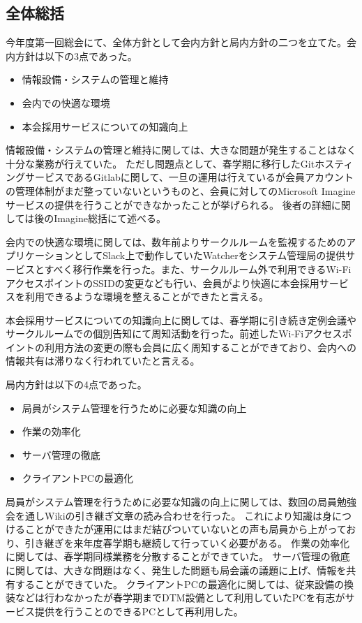 \subsection*{全体総括}


今年度第一回総会にて、全体方針として会内方針と局内方針の二つを立てた。会内方針は以下の3点であった。
\begin{itemize}
  \item 情報設備・システムの管理と維持
  \item 会内での快適な環境
  \item 本会採用サービスについての知識向上
\end{itemize}

情報設備・システムの管理と維持に関しては、大きな問題が発生することはなく十分な業務が行えていた。
ただし問題点として、春学期に移行したGitホスティングサービスであるGitlabに関して、一旦の運用は行えているが会員アカウントの管理体制がまだ整っていないというものと、会員に対してのMicrosoft Imagineサービスの提供を行うことができなかったことが挙げられる。
後者の詳細に関しては後のImagine総括にて述べる。

会内での快適な環境に関しては、数年前よりサークルルームを監視するためのアプリケーションとしてSlack上で動作していたWatcherをシステム管理局の提供サービスとすべく移行作業を行った。また、サークルルーム外で利用できるWi-FiアクセスポイントのSSIDの変更なども行い、会員がより快適に本会採用サービスを利用できるような環境を整えることができたと言える。

本会採用サービスについての知識向上に関しては、春学期に引き続き定例会議やサークルルームでの個別告知にて周知活動を行った。前述したWi-Fiアクセスポイントの利用方法の変更の際も会員に広く周知することができており、会内への情報共有は滞りなく行われていたと言える。

局内方針は以下の4点であった。
\begin{itemize}
  \item 局員がシステム管理を行うために必要な知識の向上
  \item 作業の効率化
  \item サーバ管理の徹底
  \item クライアントPCの最適化
\end{itemize}

局員がシステム管理を行うために必要な知識の向上に関しては、数回の局員勉強会を通しWikiの引き継ぎ文章の読み合わせを行った。
これにより知識は身につけることができたが運用にはまだ結びついていないとの声も局員から上がっており、引き継ぎを来年度春学期も継続して行っていく必要がある。
作業の効率化に関しては、春学期同様業務を分散することができていた。
サーバ管理の徹底に関しては、大きな問題はなく、発生した問題も局会議の議題に上げ、情報を共有することができていた。
クライアントPCの最適化に関しては、従来設備の換装などは行わなかったが春学期までDTM設備として利用していたPCを有志がサービス提供を行うことのできるPCとして再利用した。
